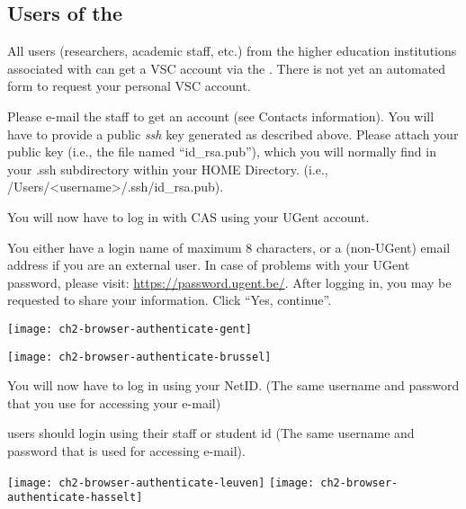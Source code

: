 \subsection{Users of the \association}
\label{sec:users-of-association}

All users (researchers, academic staff, etc.) from the higher education
institutions associated with \university can get a VSC account via the \university. There is not
yet an automated form to request your personal VSC account.

Please e-mail the \hpc staff to get an account (see Contacts information).
You will have to provide a public \emph{ssh} key generated as described
above. Please attach your public key (i.e., the file named ``id\_rsa.pub''),
which you will normally find in your .ssh subdirectory within your HOME
Directory. (i.e., /Users/<{}username>{}/.ssh/id\_rsa.pub).


\fi %

\ifgent
  You will now have to log in with CAS using your UGent account.

  You either have a
  login name of maximum 8 characters, or a (non-UGent) email address if you are an external
  user. In case of problems with your UGent password, please visit:
  \url{https://password.ugent.be/}. After logging in, you may be requested
  to share your information. Click ``Yes, continue''.
  \begin{center}
  \texttt{[image: ch2-browser-authenticate-gent]}
  \end{center}
\fi

\ifbrussel
  \begin{center}
  \texttt{[image: ch2-browser-authenticate-brussel]}
  \end{center}

  You will now have to log in using your NetID. (The same username and password that you use for accessing your e-mail)

\fi

\ifleuven
\hpc users should login using their staff or student id
(The same username and password that is used for accessing e-mail).

 \begin{center}
  \texttt{[image: ch2-browser-authenticate-leuven]}
  \texttt{[image: ch2-browser-authenticate-hasselt]}
  \end{center}


